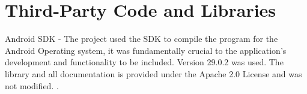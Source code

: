 \chapter{Third-Party Code and Libraries}






Android SDK - The project used the SDK to compile the program for the Android Operating system, it was fundamentally crucial to the application's development and functionality to be included. Version 29.0.2 was used. The library and all documentation is provided under the Apache 2.0 License and was not modified.
\cite{APACHE2LICENSE}.

